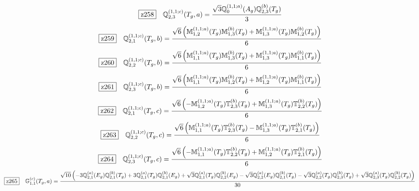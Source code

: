 \documentclass[fleqn,10pt,landscape]{jsarticle}
\begin{document}
\begin{dmath*}
\hspace*{3mm}\fbox{z258}\quad \mathbb{Q}_{2,3}^{(1,1;c)}(T_{g},a)=\frac{\sqrt{3} \mathbb{Q}_{0}^{(1,1;a)}(A_{g}) \mathbb{Q}_{2,3}^{(b)}(T_{g})}{3}
\end{dmath*}
\begin{dmath*}
\hspace*{3mm}\fbox{z259}\quad \mathbb{Q}_{2,1}^{(1,1;c)}(T_{g},b)=\frac{\sqrt{6} \left(\mathbb{M}_{1,2}^{(1,1;a)}(T_{g}) \mathbb{M}_{1,3}^{(b)}(T_{g}) + \mathbb{M}_{1,3}^{(1,1;a)}(T_{g}) \mathbb{M}_{1,2}^{(b)}(T_{g})\right)}{6}
\end{dmath*}
\begin{dmath*}
\hspace*{3mm}\fbox{z260}\quad \mathbb{Q}_{2,2}^{(1,1;c)}(T_{g},b)=\frac{\sqrt{6} \left(\mathbb{M}_{1,1}^{(1,1;a)}(T_{g}) \mathbb{M}_{1,3}^{(b)}(T_{g}) + \mathbb{M}_{1,3}^{(1,1;a)}(T_{g}) \mathbb{M}_{1,1}^{(b)}(T_{g})\right)}{6}
\end{dmath*}
\begin{dmath*}
\hspace*{3mm}\fbox{z261}\quad \mathbb{Q}_{2,3}^{(1,1;c)}(T_{g},b)=\frac{\sqrt{6} \left(\mathbb{M}_{1,1}^{(1,1;a)}(T_{g}) \mathbb{M}_{1,2}^{(b)}(T_{g}) + \mathbb{M}_{1,2}^{(1,1;a)}(T_{g}) \mathbb{M}_{1,1}^{(b)}(T_{g})\right)}{6}
\end{dmath*}
\begin{dmath*}
\hspace*{3mm}\fbox{z262}\quad \mathbb{Q}_{2,1}^{(1,1;c)}(T_{g},c)=\frac{\sqrt{6} \left(- \mathbb{M}_{1,2}^{(1,1;a)}(T_{g}) \mathbb{T}_{2,3}^{(b)}(T_{g}) + \mathbb{M}_{1,3}^{(1,1;a)}(T_{g}) \mathbb{T}_{2,2}^{(b)}(T_{g})\right)}{6}
\end{dmath*}
\begin{dmath*}
\hspace*{3mm}\fbox{z263}\quad \mathbb{Q}_{2,2}^{(1,1;c)}(T_{g},c)=\frac{\sqrt{6} \left(\mathbb{M}_{1,1}^{(1,1;a)}(T_{g}) \mathbb{T}_{2,3}^{(b)}(T_{g}) - \mathbb{M}_{1,3}^{(1,1;a)}(T_{g}) \mathbb{T}_{2,1}^{(b)}(T_{g})\right)}{6}
\end{dmath*}
\begin{dmath*}
\hspace*{3mm}\fbox{z264}\quad \mathbb{Q}_{2,3}^{(1,1;c)}(T_{g},c)=\frac{\sqrt{6} \left(- \mathbb{M}_{1,1}^{(1,1;a)}(T_{g}) \mathbb{T}_{2,2}^{(b)}(T_{g}) + \mathbb{M}_{1,2}^{(1,1;a)}(T_{g}) \mathbb{T}_{2,1}^{(b)}(T_{g})\right)}{6}
\end{dmath*}
\begin{dmath*}
\hspace*{3mm}\fbox{z265}\quad \mathbb{G}_{1,1}^{(c)}(T_{g},a)=\frac{\sqrt{10} \left(- 3 \mathbb{Q}_{2,1}^{(a)}(E_{g}) \mathbb{Q}_{2,1}^{(b)}(T_{g}) + 3 \mathbb{Q}_{2,1}^{(a)}(T_{g}) \mathbb{Q}_{2,1}^{(b)}(E_{g}) + \sqrt{3} \mathbb{Q}_{2,1}^{(a)}(T_{g}) \mathbb{Q}_{2,2}^{(b)}(E_{g}) - \sqrt{3} \mathbb{Q}_{2,2}^{(a)}(E_{g}) \mathbb{Q}_{2,1}^{(b)}(T_{g}) - \sqrt{3} \mathbb{Q}_{2,2}^{(a)}(T_{g}) \mathbb{Q}_{2,3}^{(b)}(T_{g}) + \sqrt{3} \mathbb{Q}_{2,3}^{(a)}(T_{g}) \mathbb{Q}_{2,2}^{(b)}(T_{g})\right)}{30}
\end{dmath*}
\end{document}
